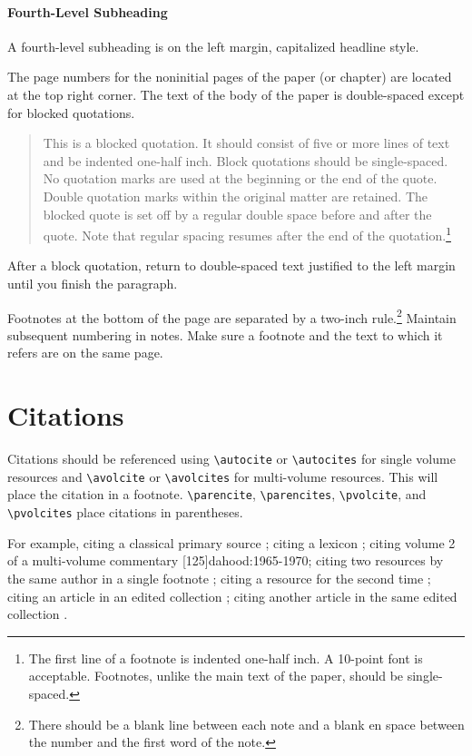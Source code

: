 \documentclass{sblarticle}
\begin{document}
\paragraph{Fourth-Level Subheading}

A fourth-level subheading is on the left margin, capitalized headline style.

The page numbers for the noninitial pages of the paper (or chapter) are
located at the top right corner. The text of the body of the paper is
double-spaced except for blocked
quotations.
\begin{quote}
  This is a blocked quotation. It should consist of five or more lines of text
  and be indented one-half inch. Block quotations should be single-spaced. No
  quotation marks are used at the beginning or the end of the quote. Double
  quotation marks within the original matter are retained. The blocked quote
  is set off by a regular double space before and after the quote. Note that
  regular spacing resumes after the end of the quotation.\footnote{The first
  line of a footnote is indented one-half inch. A 10-point font is acceptable.
  Footnotes, unlike the main text of the paper, should be single-spaced.}
\end{quote}
After a block quotation, return to double-spaced text justified to the left
margin until you finish the paragraph.

Footnotes at the bottom of the page are separated by a two-inch
rule.\footnote{There should be a blank line between each note and a blank en
space between the number and the first word of the note.} Maintain subsequent
numbering in notes. Make sure a footnote and the text to which it refers are
on the same page.

\section{Citations}

Citations should be referenced using \verb+\autocite+ or \verb+\autocites+ for
single volume resources and \verb+\avolcite+ or \verb+\avolcites+ for
multi-volume resources. This will place the citation in a footnote.
\verb+\parencite+, \verb+\parencites+, \verb+\pvolcite+, and \verb+\pvolcites+
place citations in parentheses.

For example, citing a classical primary source ;
citing a lexicon \autocite[\foreignlanguage{polytonicgreek}{παρρησία}]{BDAG};
citing volume 2 of a multi-volume commentary
[125]{dahood:1965-1970}; citing two resources by the same author
in a single footnote \autocites[504]{harrington:1970}[241]{harrington:1986};
citing a resource for the second time \autocite[505]{harrington:1970}; citing
an article in an edited collection \autocite{collins:1986}; citing another
article in the same edited collection \autocite{attridge:1986}.
\end{document}
